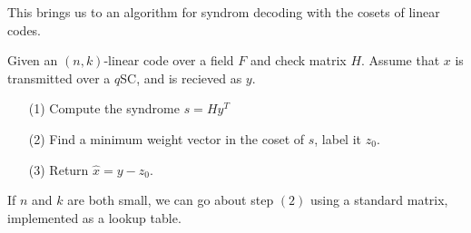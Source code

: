 This brings us to an algorithm for syndrom decoding with the cosets of linear
codes.

\begin{algorithm}
    Given an $(n,k)$-linear code over a field $F$ and check matrix $H$.
    Assume that $x$ is transmitted over a  $q$SC, and is recieved as  $y$.
    \begin{enumerate}
        \item[(1)] Compute the syndrome $s=Hy^T$

        \item[(2)] Find a minimum weight vector in the coset of $s$, label it
            $z_0$.

        \item[(3)] Return $\hat{x}=y-z_0$.
    \end{enumerate}
\end{algorithm}
\begin{remark}
    If $n$ and $k$ are both small, we can go about step  $(2)$ using a standard
    matrix, implemented as a lookup table.
\end{remark}
